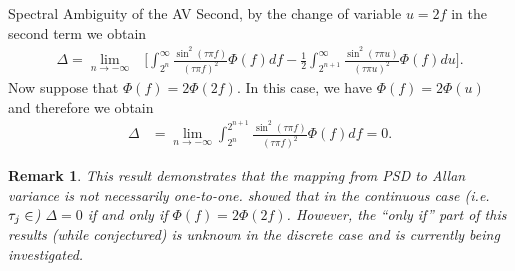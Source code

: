 \documentclass[envcountsect,usenames,dvipsnames]{beamer}
\theoremstyle{mystyle}
\newtheorem{Remark}{Remark}
\begin{document}
\begin{frame}{Spectral Ambiguity of the AV}
\small
Second, by the change of variable $u = 2f$ in the second term we obtain
%
\begin{equation*}
    \begin{aligned}
        \Delta = \lim_{n \rightarrow -\infty} & \Bigg[ \int_{2^{n}}^{\infty} \frac{\sin^2\left(\tau \pi f \right)}{\left(\tau \pi f \right)^2} \Phi(f) df - \frac{1}{2}\int_{2^{n+1}}^{\infty} \frac{\sin^2\left(\tau \pi u \right)}{\left(\tau \pi u \right)^2} \Phi(f) du \Bigg].
    \end{aligned}
\end{equation*}
%
Now suppose that $\Phi(f) = 2 \Phi(2f)$. In this case, we have $\Phi(f) = 2 \Phi(u)$ and therefore we obtain
\begin{equation*}
    \begin{aligned}
        \Delta &= \lim_{n \rightarrow -\infty} \int_{2^{n}}^{2^{n+1}} \frac{\sin^2\left(\tau \pi f \right)}{\left(\tau \pi f \right)^2} \Phi(f) df = 0.
    \end{aligned}
\end{equation*}

\begin{Remark}
This result demonstrates that the mapping from PSD to Allan variance is not necessarily one-to-one. \cite{greenhall1998spectral} showed that in the continuous case (i.e. $\tau_j \in \real$) $\Delta = 0$ if and only if $\Phi(f) = 2 \Phi(2f)$. However, the ``only if'' part of this results (while conjectured) is unknown in the discrete case and is currently being investigated.
\end{Remark}

\end{frame}
\end{document}
